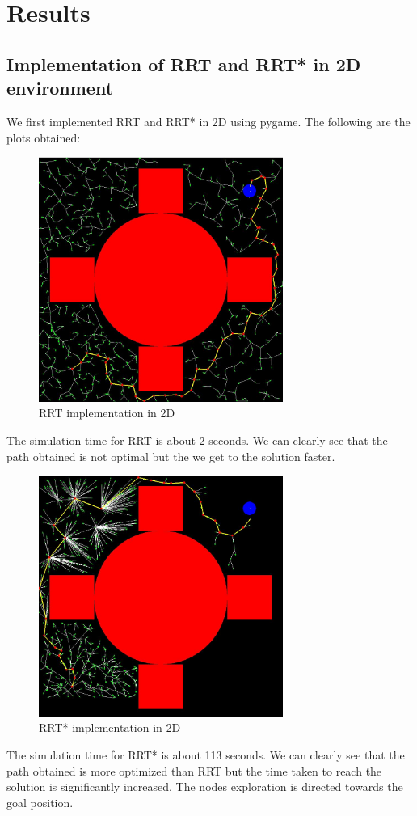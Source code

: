 \documentclass{IEEEtran}
\begin{document}
\section{\textbf{Results}}
\subsection{\textbf{Implementation of RRT and RRT* in 2D environment}}
We first implemented RRT and RRT* in 2D using pygame. The following are the plots obtained:
\begin{figure}[h]
    \centering
    \includegraphics[width=8cm]{rrt2d}
    \caption{RRT implementation in 2D}
    \label{fig:RRT implementation in 2D}
\end{figure}
\newline 
The simulation time for RRT is about 2 seconds. We can clearly see that the path obtained is not optimal but the we get to the solution faster.
\newpage
\begin{figure}[h]
    \centering
    \includegraphics[width=8cm]{rrt2d1}
    \caption{RRT* implementation in 2D}
    \label{fig:RRT* implementation in 2D}
\end{figure} 
The simulation time for RRT* is about 113 seconds. We can clearly see that the path obtained is more optimized than RRT but the time taken to reach the solution is significantly increased. The nodes exploration is directed towards the goal position.
\end{document}
